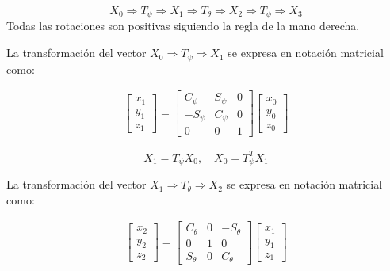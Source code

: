 \begin{equation}
    X_{0} \Rightarrow T_{\psi} \Rightarrow X_{1} \Rightarrow T_{\theta} \Rightarrow X_{2} \Rightarrow T_{\phi} \Rightarrow X_{3}
\end{equation}
Todas las rotaciones son positivas siguiendo la regla de la mano derecha.

La transformación del vector $X_{0} \Rightarrow T_{\psi} \Rightarrow X_{1}$ se expresa en notación matricial como:

\begin{gather}
    \begin{bmatrix}
    x_{1}\\
    y_{1}\\
    z_{1}
    \end{bmatrix}
    =
    \begin{bmatrix}
    C_{\psi} & S_{\psi} & 0\\
    -S_{\psi} & C_{\psi} & 0\\
    0 & 0 & 1
    \end{bmatrix}
    \begin{bmatrix}
    x_{0}\\
    y_{0}\\
    z_{0}
    \end{bmatrix}
\end{gather}

\begin{equation}
    X_{1} = T_{\psi}X_{0},\quad X_{0}= T^T_{\psi}X_{1}
\end{equation}

La transformación del vector $X_{1} \Rightarrow T_{\theta} \Rightarrow X_{2}$ se expresa en notación matricial como:

\begin{gather}
    \begin{bmatrix}
    x_{2}\\
    y_{2}\\
    z_{2}
    \end{bmatrix}
    =
    \begin{bmatrix}
    C_{\theta} & 0 & -S_{\theta}\\
    0 & 1 & 0\\
    S_{\theta} & 0 & C_{\theta}
    \end{bmatrix}
    \begin{bmatrix}
    x_{1}\\
    y_{1}\\
    z_{1}
    \end{bmatrix}
\end{gather}

